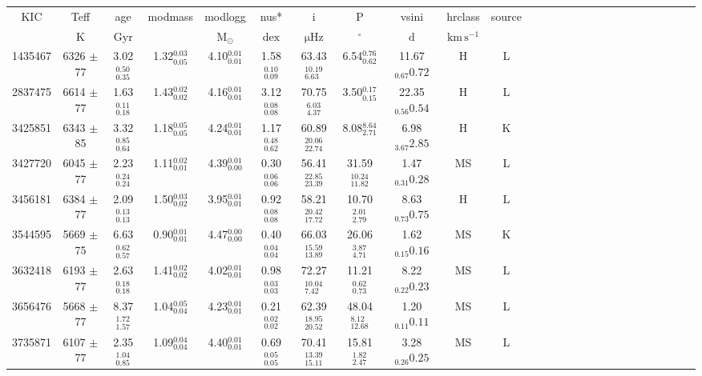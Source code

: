 \begin{table}
\begin{tabular}{cccccccccccccccccccccccccc}
KIC & Teff         & age                    & modmass &          modlogg            & nus*               & i                     & P                 & vsini &  hrclass & source \\
    & $\mathrm{K}$ &  $\mathrm{Gyr}$&       & $\mathrm{M_{\odot}}$ & $\mathrm{dex}$ & $\mathrm{\mu Hz}$  & $\mathrm{{}^{\circ}}$ & $\mathrm{d}$      & $\mathrm{km\,s^{-1}}$ &  &  &  &  \\
1435467  & 6326 $\pm$ 77 & 3.02$_{0.35}^{0.50}$ & 1.32$_{0.05}^{0.03}$ & 4.10$_{0.01}^{0.01}$ & 1.58$_{0.09}^{0.10}$ & 63.43$_{6.63}^{10.19}$ & 6.54$_{0.62}^{0.76}$ & 11.67$_{0.67}{0.72}$ & H & L \\
2837475  & 6614 $\pm$ 77 & 1.63$_{0.18}^{0.11}$ & 1.43$_{0.02}^{0.02}$ & 4.16$_{0.01}^{0.01}$ & 3.12$_{0.08}^{0.08}$ & 70.75$_{4.37}^{6.03}$ & 3.50$_{0.15}^{0.17}$ & 22.35$_{0.56}{0.54}$ & H & L \\
3425851  & 6343 $\pm$ 85 & 3.32$_{0.64}^{0.85}$ & 1.18$_{0.05}^{0.05}$ & 4.24$_{0.01}^{0.01}$ & 1.17$_{0.62}^{0.48}$ & 60.89$_{22.74}^{20.06}$ & 8.08$_{2.71}^{8.64}$ & 6.98$_{3.67}{2.85}$ & H & K \\
3427720  & 6045 $\pm$ 77 & 2.23$_{0.24}^{0.24}$ & 1.11$_{0.01}^{0.02}$ & 4.39$_{0.00}^{0.01}$ & 0.30$_{0.06}^{0.06}$ & 56.41$_{23.39}^{22.85}$ & 31.59$_{11.82}^{10.24}$ & 1.47$_{0.31}{0.28}$ & MS & L \\
3456181  & 6384 $\pm$ 77 & 2.09$_{0.13}^{0.13}$ & 1.50$_{0.02}^{0.03}$ & 3.95$_{0.01}^{0.01}$ & 0.92$_{0.08}^{0.08}$ & 58.21$_{17.72}^{20.42}$ & 10.70$_{2.79}^{2.01}$ & 8.63$_{0.73}{0.75}$ & H & L \\
3544595  & 5669 $\pm$ 75 & 6.63$_{0.57}^{0.62}$ & 0.90$_{0.01}^{0.01}$ & 4.47$_{0.00}^{0.00}$ & 0.40$_{0.04}^{0.04}$ & 66.03$_{13.89}^{15.59}$ & 26.06$_{4.71}^{3.87}$ & 1.62$_{0.15}{0.16}$ & MS & K \\
3632418  & 6193 $\pm$ 77 & 2.63$_{0.18}^{0.18}$ & 1.41$_{0.02}^{0.02}$ & 4.02$_{0.01}^{0.01}$ & 0.98$_{0.03}^{0.03}$ & 72.27$_{7.42}^{10.04}$ & 11.21$_{0.73}^{0.62}$ & 8.22$_{0.22}{0.23}$ & MS & L \\
3656476  & 5668 $\pm$ 77 & 8.37$_{1.57}^{1.72}$ & 1.04$_{0.04}^{0.05}$ & 4.23$_{0.01}^{0.01}$ & 0.21$_{0.02}^{0.02}$ & 62.39$_{20.52}^{18.95}$ & 48.04$_{12.68}^{8.12}$ & 1.20$_{0.11}{0.11}$ & MS & L \\
3735871  & 6107 $\pm$ 77 & 2.35$_{0.85}^{1.04}$ & 1.09$_{0.04}^{0.04}$ & 4.40$_{0.01}^{0.01}$ & 0.69$_{0.05}^{0.05}$ & 70.41$_{15.11}^{13.39}$ & 15.81$_{2.47}^{1.82}$ & 3.28$_{0.26}{0.25}$ & MS & L \\

\end{tabular}
\end{table}
